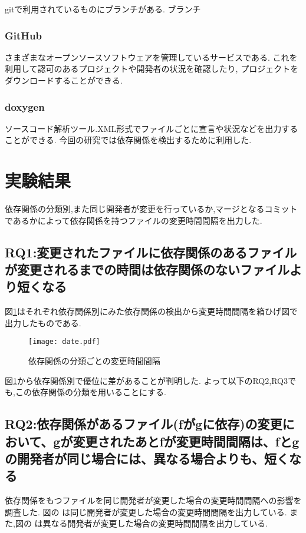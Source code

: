 \documentclass{fose2016}           %
\begin{document}
gitで利用されているものにブランチがある.
ブランチ

\subsubsection{GitHub}
さまざまなオープンソースソフトウェアを管理しているサービスである.
これを利用して認可のあるプロジェクトや開発者の状況を確認したり, プロジェクトをダウンロードすることができる.


% 

\subsubsection{doxygen}
ソースコード解析ツール.XML形式でファイルごとに宣言や状況などを出力することができる.
今回の研究では依存関係を検出するために利用した.



\section{実験結果}\label{実験結果}
依存関係の分類別,また同じ開発者が変更を行っているか,マージとなるコミットであるかによって依存関係を持つファイルの変更時間間隔を出力した.

\subsection{RQ1:変更されたファイルに依存関係のあるファイルが変更されるまでの時間は依存関係のないファイルより短くなる}
図\ref{fig:subdate}はそれぞれ依存関係別にみた依存関係の検出から変更時間間隔を箱ひげ図で出力したものである.　　

\begin{figure}
\centering
\texttt{[image: date.pdf]}
\caption{依存関係の分類ごとの変更時間間隔}
\label{fig:subdate} 
\end{figure}




図\ref{fig:subdate}から依存関係別で優位に差があることが判明した.
よって以下のRQ2,RQ3でも,この依存関係の分類を用いることにする.


\subsection{RQ2:依存関係があるファイル(fがgに依存)の変更において、gが変更されたあとfが変更時間間隔は、fとgの開発者が同じ場合には、異なる場合よりも、短くなる}
依存関係をもつファイルを同じ開発者が変更した場合の変更時間間隔への影響を調査した.
図の\label{fig:author_true_subdate} は同じ開発者が変更した場合の変更時間間隔を出力している.
また,図の\label{fig:author_false_subdate} は異なる開発者が変更した場合の変更時間間隔を出力している.
\end{document}
